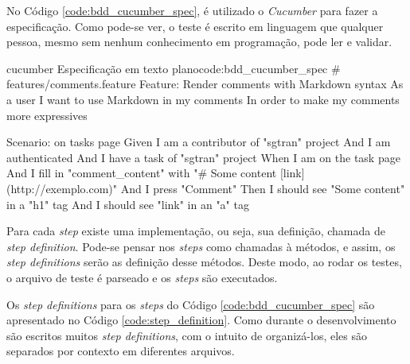 No Código \ref{code:bdd_cucumber_spec}, é utilizado o \textit{Cucumber} para fazer a especificação. Como pode-se ver, o teste é escrito em linguagem que qualquer pessoa, mesmo sem nenhum conhecimento em programação, pode ler e validar.

\begin{mycode}{cucumber}%
{Especificação em texto plano}{code:bdd_cucumber_spec}
# features/comments.feature
Feature: Render comments with Markdown syntax
  As a user
  I want to use Markdown in my comments
  In order to make my comments more expressives

  Scenario: on tasks page
    Given I am a contributor of "sgtran" project
    And I am authenticated
    And I have a task of "sgtran" project
    When I am on the task page
    And I fill in "comment_content" with "# Some content [link](http://exemplo.com)"
    And I press "Comment"
    Then I should see "Some content" in a "h1" tag
    And I should see "link" in an "a" tag
\end{mycode}

Para cada \textit{step} existe uma implementação, ou seja, sua definição, chamada de \textit{step definition}. Pode-se pensar nos \textit{steps} como chamadas à métodos, e assim, os \textit{step definitions} serão as definição desse métodos. Deste modo, ao rodar os testes, o arquivo de teste é parseado e os \textit{steps} são executados.

Os \textit{step definitions} para os \textit{steps} do Código \ref{code:bdd_cucumber_spec} são apresentado no Código \ref{code:step_definition}. Como durante o desenvolvimento são escritos muitos \textit{step definitions}, com o intuito de organizá-los, eles são separados por contexto em diferentes arquivos.


